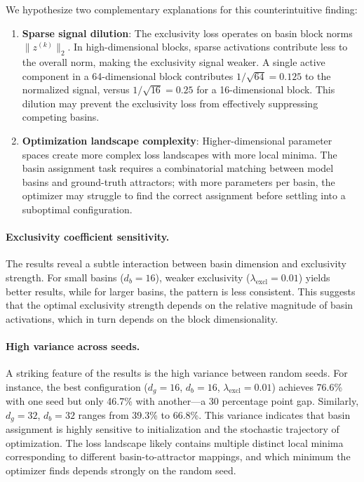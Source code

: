 We hypothesize two complementary explanations for this counterintuitive finding:

\begin{enumerate}
    \item \textbf{Sparse signal dilution}: The exclusivity loss operates on basin block norms $\|z^{(k)}\|_2$. In high-dimensional blocks, sparse activations contribute less to the overall norm, making the exclusivity signal weaker. A single active component in a 64-dimensional block contributes $1/\sqrt{64} = 0.125$ to the normalized signal, versus $1/\sqrt{16} = 0.25$ for a 16-dimensional block. This dilution may prevent the exclusivity loss from effectively suppressing competing basins.

    \item \textbf{Optimization landscape complexity}: Higher-dimensional parameter spaces create more complex loss landscapes with more local minima. The basin assignment task requires a combinatorial matching between model basins and ground-truth attractors; with more parameters per basin, the optimizer may struggle to find the correct assignment before settling into a suboptimal configuration.
\end{enumerate}

\paragraph{Exclusivity coefficient sensitivity.}
The results reveal a subtle interaction between basin dimension and exclusivity strength. For small basins ($d_b = 16$), weaker exclusivity ($\lambda_{\text{excl}} = 0.01$) yields better results, while for larger basins, the pattern is less consistent. This suggests that the optimal exclusivity strength depends on the relative magnitude of basin activations, which in turn depends on the block dimensionality.

\paragraph{High variance across seeds.}
A striking feature of the results is the high variance between random seeds. For instance, the best configuration ($d_g = 16$, $d_b = 16$, $\lambda_{\text{excl}} = 0.01$) achieves 76.6\% with one seed but only 46.7\% with another---a 30 percentage point gap. Similarly, $d_g = 32$, $d_b = 32$ ranges from 39.3\% to 66.8\%. This variance indicates that basin assignment is highly sensitive to initialization and the stochastic trajectory of optimization. The loss landscape likely contains multiple distinct local minima corresponding to different basin-to-attractor mappings, and which minimum the optimizer finds depends strongly on the random seed.

